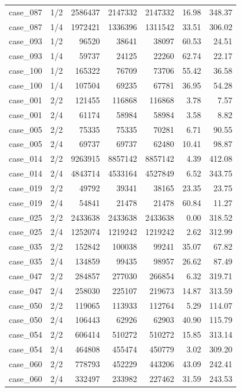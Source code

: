 \begin{tabular}{llrrrrr}
case\_087 & 1/2 & 2586437 & 2147332 & 2147332 & 16.98 & 348.37 \\
case\_087 & 1/4 & 1972421 & 1336396 & 1311542 & 33.51 & 306.02 \\
case\_093 & 1/2 & 96520 & 38641 & 38097 & 60.53 & 24.51 \\
case\_093 & 1/4 & 59737 & 24125 & 22260 & 62.74 & 22.17 \\
case\_100 & 1/2 & 165322 & 76709 & 73706 & 55.42 & 36.58 \\
case\_100 & 1/4 & 107504 & 69235 & 67781 & 36.95 & 54.28 \\
case\_001 & 2/2 & 121455 & 116868 & 116868 & 3.78 & 7.57 \\
case\_001 & 2/4 & 61174 & 58984 & 58984 & 3.58 & 8.82 \\
case\_005 & 2/2 & 75335 & 75335 & 70281 & 6.71 & 90.55 \\
case\_005 & 2/4 & 69737 & 69737 & 62480 & 10.41 & 98.87 \\
case\_014 & 2/2 & 9263915 & 8857142 & 8857142 & 4.39 & 412.08 \\
case\_014 & 2/4 & 4843714 & 4533164 & 4527849 & 6.52 & 343.75 \\
case\_019 & 2/2 & 49792 & 39341 & 38165 & 23.35 & 23.75 \\
case\_019 & 2/4 & 54841 & 21478 & 21478 & 60.84 & 11.27 \\
case\_025 & 2/2 & 2433638 & 2433638 & 2433638 & 0.00 & 318.52 \\
case\_025 & 2/4 & 1252074 & 1219242 & 1219242 & 2.62 & 312.99 \\
case\_035 & 2/2 & 152842 & 100038 & 99241 & 35.07 & 67.82 \\
case\_035 & 2/4 & 134859 & 99435 & 98957 & 26.62 & 87.49 \\
case\_047 & 2/2 & 284857 & 277030 & 266854 & 6.32 & 319.71 \\
case\_047 & 2/4 & 258030 & 225107 & 219673 & 14.87 & 313.59 \\
case\_050 & 2/2 & 119065 & 113933 & 112764 & 5.29 & 114.07 \\
case\_050 & 2/4 & 106443 & 62926 & 62903 & 40.90 & 115.79 \\
case\_054 & 2/2 & 606414 & 510272 & 510272 & 15.85 & 313.14 \\
case\_054 & 2/4 & 464808 & 455474 & 450779 & 3.02 & 309.20 \\
case\_060 & 2/2 & 778793 & 452229 & 443206 & 43.09 & 242.41 \\
case\_060 & 2/4 & 332497 & 233982 & 227462 & 31.59 & 243.53 \\

\end{tabular}
